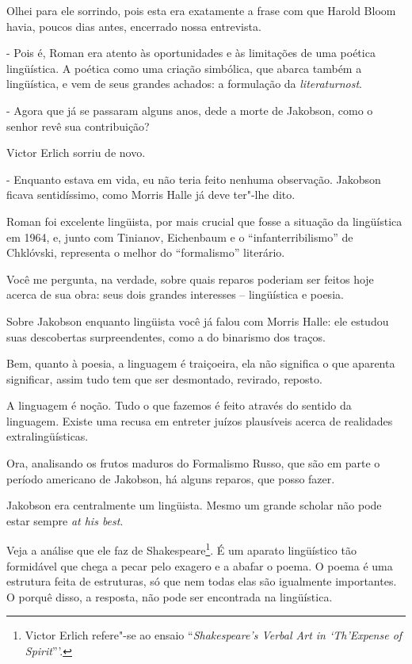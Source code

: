 Olhei para ele sorrindo, pois esta era exatamente a frase com que Harold
Bloom havia, poucos dias antes, encerrado nossa entrevista.

- Pois é, Roman era atento às oportunidades e às limitações de uma
poética lingüística. A poética como uma criação simbólica, que abarca
também a lingüística, e vem de seus grandes achados: a formulação da
\emph{literaturnost}.

- Agora que já se passaram alguns anos, dede a morte de Jakobson, como o
senhor revê sua contribuição?

Victor Erlich sorriu de novo.

- Enquanto estava em vida, eu não teria feito nenhuma observação.
Jakobson ficava sentidíssimo, como Morris Halle já deve ter"-lhe dito.

Roman foi excelente lingüista, por mais crucial que fosse a situação da
lingüística em 1964, e, junto com Tinianov, Eichenbaum e o
``infanterribilismo'' de Chklóvski, representa o melhor do
``formalismo'' literário.

Você me pergunta, na verdade, sobre quais reparos poderiam ser feitos
hoje acerca de sua obra: seus dois grandes interesses -- lingüística e
poesia.

Sobre Jakobson enquanto lingüista você já falou com Morris Halle: ele
estudou suas descobertas surpreendentes, como a do binarismo dos traços.

Bem, quanto à poesia, a linguagem é traiçoeira, ela não significa o que
aparenta significar, assim tudo tem que ser desmontado, revirado,
reposto.

A linguagem é noção. Tudo o que fazemos é feito através do sentido da
linguagem. Existe uma recusa em entreter juízos plausíveis acerca de
realidades extralingüísticas.

Ora, analisando os frutos maduros do Formalismo Russo, que são em parte
o período americano de Jakobson, há alguns reparos, que posso fazer.

Jakobson era centralmente um lingüista. Mesmo um grande scholar não pode
estar sempre \emph{at his best}.

Veja a análise que ele faz de Shakespeare\footnote{Victor Erlich
  refere"-se ao ensaio ``\emph{Shakespeare's Verbal Art in `Th'Expense of
  Spirit}'''.}. É um aparato lingüístico tão formidável que chega a
pecar pelo exagero e a abafar o poema. O poema é uma estrutura feita de
estruturas, só que nem todas elas são igualmente importantes. O porquê
disso, a resposta, não pode ser encontrada na lingüística.


